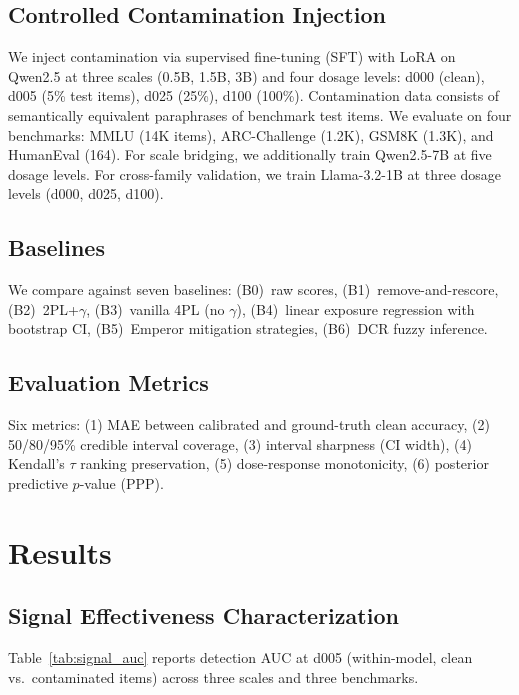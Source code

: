 \documentclass[11pt,a4paper]{article}
\begin{document}
\subsection{Controlled Contamination Injection}

We inject contamination via supervised fine-tuning (SFT) with LoRA on Qwen2.5 at three scales (0.5B, 1.5B, 3B) and four dosage levels: d000 (clean), d005 (5\% test items), d025 (25\%), d100 (100\%). Contamination data consists of semantically equivalent paraphrases of benchmark test items. We evaluate on four benchmarks: MMLU (14K items), ARC-Challenge (1.2K), GSM8K (1.3K), and HumanEval (164). For scale bridging, we additionally train Qwen2.5-7B at five dosage levels. For cross-family validation, we train Llama-3.2-1B at three dosage levels (d000, d025, d100).

\subsection{Baselines}
We compare against seven baselines: (B0)~raw scores, (B1)~remove-and-rescore, (B2)~2PL+$\gamma$, (B3)~vanilla 4PL (no $\gamma$), (B4)~linear exposure regression with bootstrap CI, (B5)~Emperor mitigation strategies, (B6)~DCR fuzzy inference.

\subsection{Evaluation Metrics}
Six metrics: (1) MAE between calibrated and ground-truth clean accuracy, (2) 50/80/95\% credible interval coverage, (3) interval sharpness (CI width), (4) Kendall's $\tau$ ranking preservation, (5) dose-response monotonicity, (6) posterior predictive $p$-value (PPP).

\section{Results}
\label{sec:results}

\subsection{Signal Effectiveness Characterization}
\label{sec:signals}

Table~\ref{tab:signal_auc} reports detection AUC at d005 (within-model, clean vs.\ contaminated items) across three scales and three benchmarks.
\end{document}
